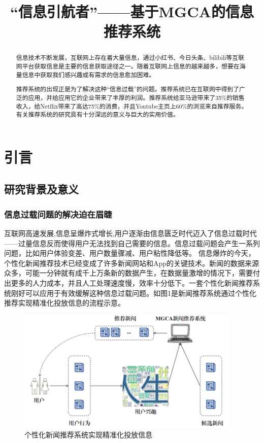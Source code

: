 \documentclass[withoutpreface,bwprint]{cumcmthesis} %
\title{“信息引航者”——基于MGCA的信息推荐系统}
\begin{document}
	
	\maketitle\thispagestyle{empty}
	\begin{abstract}
		信息技术不断发展，互联网上存在着大量信息，通过小红书、今日头条、bilibili等互联网平台获取信息是主要的信息获取途径之一。随着互联网上信息的越来越多，想要在海量信息中获取我们感兴趣或有需求的信息愈加困难。\par
		推荐系统的出现正是为了解决这种“信息过载”的问题。推荐系统已在互联网中得到了广泛的应用，并给应用它的企业带来了丰厚的利润。推荐系统给亚马逊带来了35\%的销售收入，给Netflix带来了高达75\%的消费，并且Youtube主页上60\%的浏览来自推荐服务。有关推荐系统的研究具有十分深远的意义与巨大的实用价值。\par
		
	\end{abstract}
	\setcounter{page}{1}
	\tableofcontents
	\newpage
	\section{引言}
	\subsection{研究背景及意义}
	\subsubsection{ 信息过载问题的解决迫在眉睫} 
	互联网高速发展,信息呈爆炸式增长,用户逐渐由信息匮乏时代迈入了信息过载时代——过量信息反而使得用户无法找到自己需要的信息。信息过载问题会产生一系列问题，比如用户体验变差、用户数量骤减、用户粘性降低等。
	信息爆炸的今天，个性化新闻推荐技术已经变成了许多新闻网站和App的关键技术。新闻的数据来源众多，可能一分钟就有成千上万条新的数据产生，在数据量激增的情况下，需要付出更多的人力成本，并且人工处理速度慢，效率十分低下。一套个性化新闻推荐系统刚好可以应用于有效缓解这种信息过载问题。如图1是新闻推荐系统通过个性化推荐实现精准化投放信息的流程示意。
	\begin{figure}[H]
		\centering
		\includegraphics[width=0.95\textwidth]{2}
		\caption{个性化新闻推荐系统实现精准化投放信息}
		\label{fig:circuit-diagcam}
	\end{figure}
\end{document}
